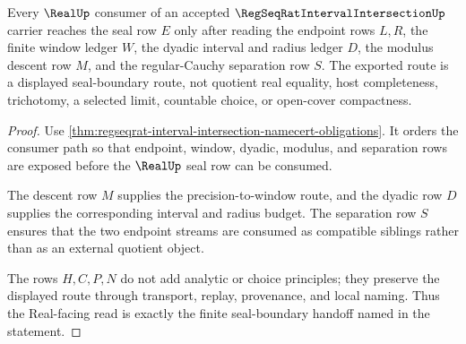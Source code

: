 \begin{theorem}
\label{thm:regseqrat-interval-intersection-real-seal-route}
Every $\RealUp$ consumer of an accepted $\RegSeqRatIntervalIntersectionUp$ carrier reaches the seal row $E$ only after reading the endpoint rows $L,R$, the finite window ledger $W$, the dyadic interval and radius ledger $D$, the modulus descent row $M$, and the regular-Cauchy separation row $S$. The exported route is a displayed seal-boundary route, not quotient real equality, host completeness, trichotomy, a selected limit, countable choice, or open-cover compactness.
\end{theorem}
\begin{proof}
Use \autoref{thm:regseqrat-interval-intersection-namecert-obligations}. It orders the consumer path so that endpoint, window, dyadic, modulus, and separation rows are exposed before the $\RealUp$ seal row can be consumed.

The descent row $M$ supplies the precision-to-window route, and the dyadic row $D$ supplies the corresponding interval and radius budget. The separation row $S$ ensures that the two endpoint streams are consumed as compatible siblings rather than as an external quotient object.

The rows $H,C,P,N$ do not add analytic or choice principles; they preserve the displayed route through transport, replay, provenance, and local naming. Thus the Real-facing read is exactly the finite seal-boundary handoff named in the statement.
\end{proof}

